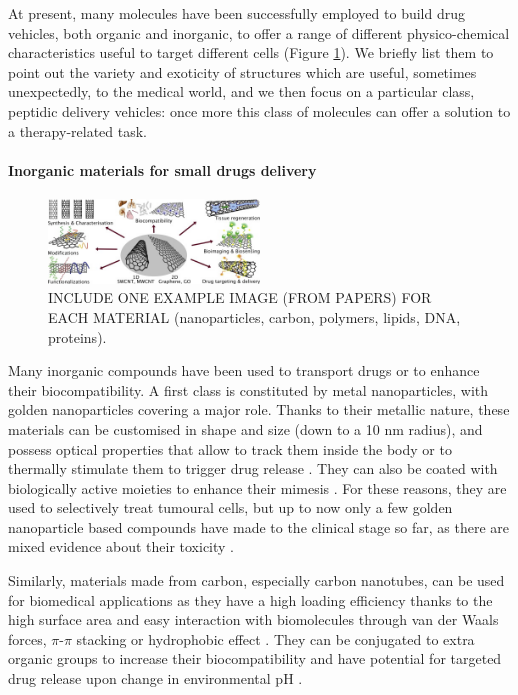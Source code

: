 At present, many molecules have been successfully employed to build drug vehicles, both organic and inorganic, to offer a range of different physico-chemical characteristics useful to target different cells \cite{Hughes2005} (Figure \ref{fig:vehicles}). We briefly list them to point out the variety and exoticity of structures which are useful, sometimes unexpectedly, to the medical world, and we then focus on a particular class, peptidic delivery vehicles: once more this class of molecules can offer a  solution to a therapy-related task.

\paragraph{Inorganic materials for small drugs delivery}

\begin{figure}
\begin{center}
\includegraphics[width = 0.5\textwidth]{1introduction/pics/carbon_review.jpg}
\vspace{0.2cm}
\caption[Materials for drug delivery vehicles]{INCLUDE ONE EXAMPLE IMAGE (FROM PAPERS) FOR EACH MATERIAL (nanoparticles, carbon, polymers, lipids, DNA, proteins).} \label{fig:vehicles}
\end{center}
\end{figure}

Many inorganic compounds have been used to transport drugs or to enhance their biocompatibility. A first class is constituted by metal nanoparticles, with golden nanoparticles covering a major role. Thanks to their metallic nature, these materials can be customised in shape and size (down to a 10 nm radius), and possess optical properties that allow to track them inside the body or to thermally stimulate them to trigger drug release \cite{Boisselier2009}. They can also be coated with biologically active moieties to enhance their mimesis \cite{Singh2018}. For these reasons, they are used to selectively treat tumoural cells, but up to now only a few golden nanoparticle based compounds have made to the clinical stage so far, as there are mixed evidence about their toxicity \cite{Boisselier2009}. 

Similarly, materials made from carbon, especially carbon nanotubes, can be used for biomedical applications as they have a high loading efficiency thanks to the high surface area and easy interaction with biomolecules through van der Waals forces, $\pi$-$\pi$ stacking or hydrophobic effect \cite{Erol2017}. They can be conjugated to extra organic groups to increase their biocompatibility and have potential for targeted drug release upon change in environmental pH \cite{Depan2011}.

